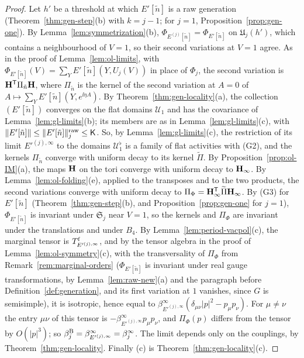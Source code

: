 \begin{proof}
Let $h'$ be a threshold at which $E'[\tilde n]$ is a raw generation (Theorem~\ref{thm:gen-step}(b) with $k=j-1$; for $j=1$, Proposition~\ref{prop:gen-one}). By Lemma~\ref{lem:symmetrization}(b), $\Phi_{E^{(j)}[\tilde n]}=\Phi_{E'[\tilde n]}$ on $\mathfrak U_j(h')$, which contains a neighbourhood of $V=1$, so their second variations at $V=1$ agree. As in the proof of Lemma~\ref{lem:ol-limits}, with $\Phi_{E'[\tilde n]}(V)=\sum_YE'[\tilde n](Y,U_j(V))$ in place of $\Phi_j$, the second variation is $\mathbf H^{\sf T}\Pi_{\tilde n}\mathbf H$, where $\Pi_{\tilde n}$ is the kernel of the second variation at $A=0$ of $A\mapsto\sum_YE'[\tilde n](Y,e^{\ii\eta A})$. By Theorem~\ref{thm:gen-locality}(a), the collection $(E'[\tilde n])$ converges on the flat domains $\mathcal U_1$ and has the covariance of Lemma~\ref{lem:gl-limits}(b); its members are as in Lemma~\ref{lem:gl-limits}(c), with $\|E'[\tilde n]\|\le\|E'[\tilde n]\|^{\rm raw}_j\le\mathsf K$. So, by Lemma~\ref{lem:gl-limits}(c), the restriction of its limit $E'^{(j),\infty}$ to the domains $\mathcal U^\flat_1$ is a family of flat activities with (G2), and the kernels $\Pi_{\tilde n}$ converge with uniform decay to its kernel $\widetilde\Pi$. By Proposition~\ref{prop:ol-IM}(a), the maps $\mathbf H$ on the tori converge with uniform decay to $\mathbf H_\infty$. By Lemma~\ref{lem:ol-folding}(e), applied to the transposes and to the two products, the second variations converge with uniform decay to $\Pi_\Phi=\mathbf H_\infty^{\sf T}\widetilde\Pi\mathbf H_\infty$. By (G3) for $E'[\tilde n]$ (Theorem~\ref{thm:gen-step}(b), and Proposition~\ref{prop:gen-one} for $j=1$), $\Phi_{E'[\tilde n]}$ is invariant under $\mathfrak S_j$ near $V=1$, so the kernels and $\Pi_\Phi$ are invariant under the translations and under $B_4$. By Lemma~\ref{lem:period-vacpol}(c), the marginal tensor is $T^{\rm f}_{E'^{(j),\infty}}$, and by the tensor algebra in the proof of Lemma~\ref{lem:ol-symmetry}(c), with the transversality of $\Pi_\Phi$ from Remark~\ref{rem:marginal-orders} ($\Phi_{E'[\tilde n]}$ is invariant under real gauge transformations, by Lemma~\ref{lem:raw-new}(a) and the paragraph before Definition~\ref{def:generation}, and its first variation at $1$ vanishes, since $G$ is semisimple), it is isotropic, hence equal to $\beta^\infty_{E'^{(j),\infty}}(\delta_{\mu\nu}|p|^2-p_\mu p_\nu)$. For $\mu\ne\nu$ the entry $\mu\nu$ of this tensor is $-\beta^\infty_{E'^{(j),\infty}}p_\mu p_\nu$, and $\Pi_\Phi(p)$ differs from the tensor by $O(|p|^3)$; so $\beta^{\rm B}_j=\beta^\infty_{E'^{(j),\infty}}=\beta^\infty_j$. The limit depends only on the couplings, by Theorem~\ref{thm:gen-locality}. Finally (c) is Theorem~\ref{thm:gen-locality}(c).
\end{proof}

